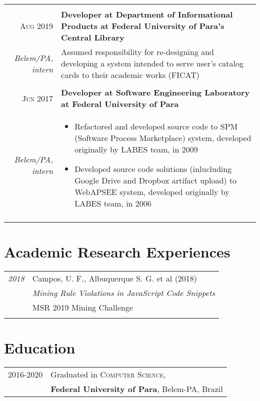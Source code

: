\documentclass[a4paper,10pt]{article}
\begin{document}
\begin{tabular}{r|p{11cm}}
\begin{itemize}
  \end{itemize}\\
\textsc{Aug 2019} & \textbf{Developer at Department of Informational Products at Federal University of Para's Central Library}\\
\footnotesize{\textit{Belem/PA, intern}}
  & \footnotesize{Assumed responsibility for re-designing and developing a system intended to serve user's catalog cards to their academic works (FICAT)}\\\\
\textsc{Jun 2017} & \textbf{Developer at Software Engineering Laboratory at Federal University of Para}\\
\footnotesize{\textit{Belem/PA, intern}}
  &\begin{itemize}
    \item \footnotesize{Refactored and developed source code to SPM (Software Process Marketplace) system, developed originally by LABES team, in 2009}
    \item \footnotesize{Developed source code solutions (inlucluding Google Drive and Dropbox artifact upload) to WebAPSEE system, developed originally by LABES team, in 2006}
  \end{itemize}\\
\multicolumn{2}{c}{}\\
\end{tabular}

\section{Academic Research Experiences}
\begin{tabular}{r|p{11cm}}
 \emph{2018} & Campos, U. F., Albuquerque S. G. et al (2018)\\
 & \textit{Mining Rule Violations in JavaScript Code Snippets}\\
 & MSR 2019 Mining Challenge\\\multicolumn{2}{c}{} \\
\end{tabular}

\section{Education}
\begin{tabular}{rl}	
2016-2020 & Graduated in \textsc{Computer Science}, \\
& \textbf{Federal University of Para}, Belem-PA, Brazil
\end{tabular}
\end{document}
